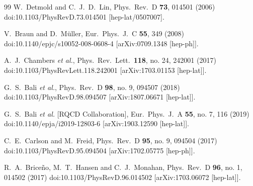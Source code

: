 \begin{thebibliography}{99}
  W.~Detmold and C.~J.~D.~Lin,
  Phys.\ Rev.\ D {\bf 73}, 014501 (2006)
  doi:10.1103/PhysRevD.73.014501
  [hep-lat/0507007].


  V.~Braun and D.~M\"uller,
  Eur.\ Phys.\ J.\ C {\bf 55}, 349 (2008)
  doi:10.1140/epjc/s10052-008-0608-4
  [arXiv:0709.1348 [hep-ph]].


  A.~J.~Chambers {\it et al.},
  Phys.\ Rev.\ Lett.\  {\bf 118}, no. 24, 242001 (2017)
  doi:10.1103/PhysRevLett.118.242001
  [arXiv:1703.01153 [hep-lat]].


  G.~S.~Bali {\it et al.},
  Phys.\ Rev.\ D {\bf 98}, no. 9, 094507 (2018)
  doi:10.1103/PhysRevD.98.094507
  [arXiv:1807.06671 [hep-lat]].


  G.~S.~Bali {\it et al.} [RQCD Collaboration],
  Eur.\ Phys.\ J.\ A {\bf 55}, no. 7, 116 (2019)
  doi:10.1140/epja/i2019-12803-6
  [arXiv:1903.12590 [hep-lat]].


  C.~E.~Carlson and M.~Freid,
  Phys.\ Rev.\ D {\bf 95}, no. 9, 094504 (2017)
  doi:10.1103/PhysRevD.95.094504
  [arXiv:1702.05775 [hep-ph]].


  R.~A.~Briceño, M.~T.~Hansen and C.~J.~Monahan,
  Phys.\ Rev.\ D {\bf 96}, no. 1, 014502 (2017)
  doi:10.1103/PhysRevD.96.014502
  [arXiv:1703.06072 [hep-lat]].



\end{thebibliography}
